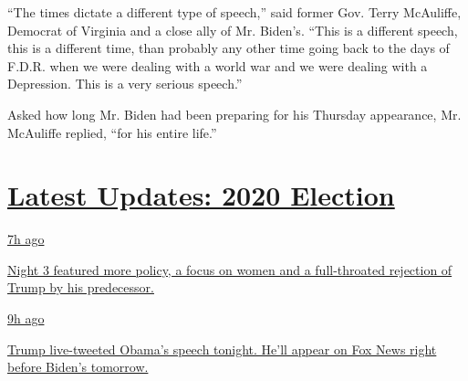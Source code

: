 ``The times dictate a different type of speech,'' said former Gov. Terry
McAuliffe, Democrat of Virginia and a close ally of Mr. Biden's. ``This
is a different speech, this is a different time, than probably any other
time going back to the days of F.D.R. when we were dealing with a world
war and we were dealing with a Depression. This is a very serious
speech.''

Asked how long Mr. Biden had been preparing for his Thursday appearance,
Mr. McAuliffe replied, ``for his entire life.''

\hypertarget{latest-updates-2020-election}{%
\section{\texorpdfstring{\href{https://www.nytimes3xbfgragh.onion/live/2020/08/19/us/dnc-convention-election?action=click\&pgtype=Article\&state=default\&region=MAIN_CONTENT_1\&context=storylines_live_updates}{Latest
Updates: 2020
Election}}{Latest Updates: 2020 Election}}\label{latest-updates-2020-election}}

\href{https://www.nytimes3xbfgragh.onion/live/2020/08/19/us/dnc-convention-election?action=click\&pgtype=Article\&state=default\&region=MAIN_CONTENT_1\&context=storylines_live_updates\#night-3-featured-more-policy-a-focus-on-women-and-a-full-throated-rejection-of-trump-by-his-predecessor}{7h
ago}

\href{https://www.nytimes3xbfgragh.onion/live/2020/08/19/us/dnc-convention-election?action=click\&pgtype=Article\&state=default\&region=MAIN_CONTENT_1\&context=storylines_live_updates\#night-3-featured-more-policy-a-focus-on-women-and-a-full-throated-rejection-of-trump-by-his-predecessor}{Night
3 featured more policy, a focus on women and a full-throated rejection
of Trump by his predecessor.}

\href{https://www.nytimes3xbfgragh.onion/live/2020/08/19/us/dnc-convention-election?action=click\&pgtype=Article\&state=default\&region=MAIN_CONTENT_1\&context=storylines_live_updates\#trump-live-tweeted-obamas-speech-tonight-hell-appear-on-fox-news-right-before-bidens-tomorrow}{9h
ago}

\href{https://www.nytimes3xbfgragh.onion/live/2020/08/19/us/dnc-convention-election?action=click\&pgtype=Article\&state=default\&region=MAIN_CONTENT_1\&context=storylines_live_updates\#trump-live-tweeted-obamas-speech-tonight-hell-appear-on-fox-news-right-before-bidens-tomorrow}{Trump
live-tweeted Obama's speech tonight. He'll appear on Fox News right
before Biden's tomorrow.}

